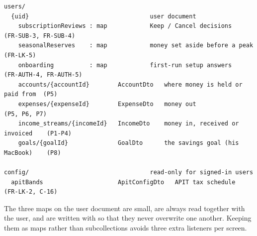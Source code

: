 \documentclass[11pt,a4paper]{article}
\begin{document}
\begin{lstlisting}
users/
  {uid}                                  user document
    subscriptionReviews : map            Keep / Cancel decisions             (FR-SUB-3, FR-SUB-4)
    seasonalReserves    : map            money set aside before a peak       (FR-LK-5)
    onboarding          : map            first-run setup answers             (FR-AUTH-4, FR-AUTH-5)
    accounts/{accountId}        AccountDto   where money is held or paid from  (P5)
    expenses/{expenseId}        ExpenseDto   money out                         (P5, P6, P7)
    income_streams/{incomeId}   IncomeDto    money in, received or invoiced    (P1-P4)
    goals/{goalId}              GoalDto      the savings goal (his MacBook)    (P8)

config/                                  read-only for signed-in users
  apitBands                     ApitConfigDto   APIT tax schedule              (FR-LK-2, C-16)
\end{lstlisting}

The three maps on the user document are small, are always read together with the user, and are written with  so that they never overwrite one another. Keeping them as maps rather than subcollections avoids three extra listeners per screen.
\end{document}
